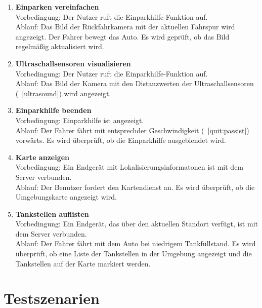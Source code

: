 \documentclass[pflichtenheft.tex]{subfiles}
\begin{document}
\begin{enumerate}
\item{\textbf{Einparken vereinfachen}} \label{parkenT} \\
Vorbedingung: Der Nutzer ruft die Einparkhilfe-Funktion auf. \\
Ablauf: Das Bild der Rückfahrkamera mit der aktuellen Fahrspur wird angezeigt. Der Fahrer bewegt das Auto. Es wird geprüft, ob das Bild regelmäßig aktualisiert wird.

\item{\textbf{Ultraschallsensoren visualisieren}} \label{ultraT} \\
Vorbedingung: Der Nutzer ruft die Einparkhilfe-Funktion auf. \\
Ablauf: Das Bild der Kamera mit den Distanzwerten der Ultraschallsensoren (~\ref{ultrasound}) wird angezeigt.

\item{\textbf{Einparkhilfe beenden}} \label{endParkenT} \\
Vorbedingung: Einparkhilfe ist angezeigt. \\
Ablauf: Der Fahrer fährt mit entsprechder Geschwindigkeit (~\ref{quit:passist}) vorwärts. Es wird überprüft, ob die Einparkhilfe ausgeblendet wird.

\item{\textbf{Karte anzeigen}} \label{showMapT} \\ 
Vorbedingung: Ein Endgerät mit Lokalisierungsinformatonen ist mit dem
Server verbunden.\\
Ablauf: Der Benutzer fordert den Kartendienst an. Es wird überprüft, ob die Umgebungskarte angezeigt wird.

\item{\textbf{Tankstellen auflisten}} \label{showFuelT} \\
Vorbedingung: Ein Endgerät, das über den aktuellen Standort verfügt, ist mit dem Server verbunden.\\
Ablauf: Der Fahrer fährt mit dem Auto bei niedrigem Tankfüllstand. Es wird überprüft, ob eine Liste der Tankstellen in der Umgebung angezeigt und die Tankstellen auf der Karte markiert werden. 

\end{enumerate}

\chapter{Testszenarien}

\renewcommand{\theenumi}{\ifnum \value{enumi}<10 0\fi\arabic{enumi}}
\renewcommand{\labelenumi}{\theenumi}
\renewcommand{\theenumii}{\arabic{enumii}}
\renewcommand{\labelenumii}{\ifnum \value{enumi}<10 0\fi\arabic{enumi}\arabic{enumii}}
\end{document}
